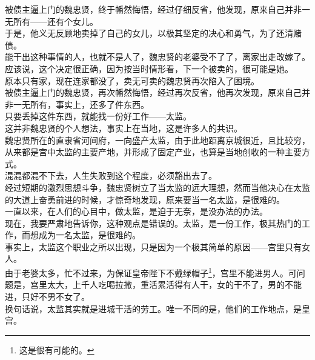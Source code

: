 \begin{multicols}{\theparacolNo}
被债主逼上门的魏忠贤，终于幡然悔悟，经过仔细反省，他发现，原来自己并非一无所有——还有个女儿。\\

于是，他义无反顾地卖掉了自己的女儿，以极其坚定的决心和勇气，为了还清赌债。\\

能干出这种事情的人，也就不是人了，魏忠贤的老婆受不了了，离家出走改嫁了。应该说，这个决定很正确，因为按当时情形看，下一个被卖的，很可能是她。\\

原本只有家，现在连家都没了，卖无可卖的魏忠贤再次陷入了困境。\\

被债主逼上门的魏忠贤，再次幡然悔悟，经过再次反省，他再次发现，原来自己并非一无所有，事实上，还多了件东西。\\

只要丢掉这件东西，就能找一份好工作——太监。\\

这并非魏忠贤的个人想法，事实上在当地，这是许多人的共识。\\

魏忠贤所在的直隶省河间府，一向盛产太监，由于此地距离京城很近，且比较穷，从来都是宫中太监的主要产地，并形成了固定产业，也算是当地创收的一种主要方式。\\

混混都混不下去，人生失败到这个程度，必须豁出去了。\\

经过短期的激烈思想斗争，魏忠贤树立了当太监的远大理想，然而当他决心在太监的大道上奋勇前进的时候，才惊奇地发现，原来要当一名太监，是很难的。\\

一直以来，在人们的心目中，做太监，是迫于无奈，是没办法的办法。\\

现在，我要严肃地告诉你，这种观点是错误的。太监，是一份工作，极其热门的工作，而想成为一名太监，是很难的。\\

事实上，太监这个职业之所以出现，只是因为一个极其简单的原因——宫里只有女人。\\

由于老婆太多，忙不过来，为保证皇帝陛下不戴绿帽子\footnote{这是很有可能的。}，宫里不能进男人。可问题是，宫里太大，上千人吃喝拉撒，重活累活得有人干，女的干不了，男的不能进，只好不男不女了。\\

换句话说，太监其实就是进城干活的劳工。唯一不同的是，他们的工作地点，是皇宫。\\


\end{multicols}
